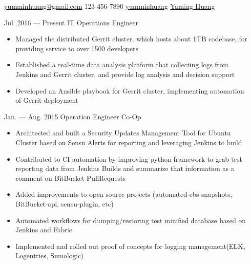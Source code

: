 \documentclass{newresume}
\begin{document}
{\href{mailto:yumminhuang@gmail.com}{yumminhuang@gmail.com}}
{123-456-7890}
{\href{https://github.com/yumminhuang}{yumminhuang}}
{\href{https://www.linkedin.com/in/yaming-huang-6a09325b}{Yaming Huang}}
{}


\begin{body}
	{Jul. 2016 --- Present}
	{IT Operations Engineer}
	{}
	\begin{itemize}[noitemsep,topsep=0pt]
		\item Managed the distributed Gerrit cluster, which hosts about 1TB codebase, for providing service to over 1500 developers
		\item Established a real-time data analysis platform that collecting logs from Jenkins and Gerrit cluster, and provide log analysis and decision support
		\item Developed an Ansible playbook for Gerrit cluster, implementing automation of Gerrit deployment
	\end{itemize}
\end{body}

\begin{body}
	{Jan. --- Aug. 2015}
	{Operation Engineer Co-Op}
	{}
	\begin{itemize}[noitemsep,topsep=0pt]
		\item Architected and built a Security Updates Management Tool for Ubuntu Cluster based on Sensu Alerts for reporting and leveraging Jenkins to build
		\item Contributed to CI automation by improving python framework to grab test reporting data from Jenkins Builds and summarize that information as a comment on BitBucket PullRequests
		\item Added improvements to open source projects (automated-ebs-snapshots, BitBucket-api, sensu-plugin, etc)
		\item Automated workflows for dumping/restoring test minified database based on Jenkins and Fabric
		\item Implemented and rolled out proof of concepts for logging management(ELK, Logentries, Sumologic)
	\end{itemize}
\end{body}
\end{document}
